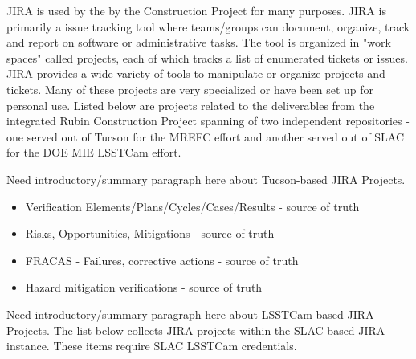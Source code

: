 JIRA is used by the by the Construction Project for many purposes.  JIRA is primarily a issue tracking tool where teams/groups can document, organize, track and report on software or administrative tasks. \citep{JIRA-cite} The tool is organized in "work spaces" called projects, each of which tracks a list of enumerated tickets or issues. JIRA provides a wide variety of tools to manipulate or organize projects and tickets. Many of these projects are very specialized or have been set up for personal use.  Listed below are projects related to the deliverables from the integrated Rubin Construction Project spanning of two independent repositories - one served out of Tucson for the MREFC effort and another served out of SLAC for the DOE MIE LSSTCam effort.

Need introductory/summary paragraph here about Tucson-based JIRA Projects.

\begin{itemize}
	\item Verification Elements/Plans/Cycles/Cases/Results - source of truth
	\item Risks, Opportunities, Mitigations - source of truth
	\item FRACAS - Failures, corrective actions - source of truth
	\item Hazard mitigation verifications - source of truth
\end{itemize}

Need introductory/summary paragraph here about LSSTCam-based JIRA Projects.
The list below collects JIRA projects within the SLAC-based JIRA instance. These items require SLAC LSSTCam credentials.

